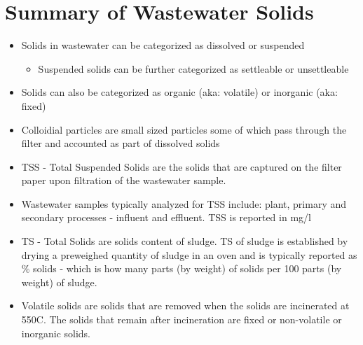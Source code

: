 	\section{Summary of Wastewater Solids}		
			\begin{itemize}
				\item Solids in wastewater can be categorized as dissolved or suspended
				      \begin{itemize}
				      	\item Suspended solids can be further categorized as settleable or unsettleable
				      \end{itemize}
				\item Solids can also be categorized as organic (aka: volatile) or inorganic (aka: fixed)
				\item Colloidial particles are small sized particles some of which pass through the filter and accounted as part of dissolved solids
				\item TSS - Total Suspended Solids are the solids that are captured on the filter paper upon filtration of the wastewater sample.  
				\item Wastewater samples typically analyzed for TSS include:  plant, primary and secondary processes - influent and effluent.  TSS is reported in mg/l
				\item TS - Total Solids are solids content of sludge.  TS of sludge is established by drying a preweighed quantity of sludge in an oven and is typically reported as \% solids - which is how many parts (by weight) of solids per 100 parts (by weight) of sludge.
				\item Volatile solids are solids that are removed when the solids are incinerated at 550C.  The solids that remain after incineration are fixed or non-volatile or inorganic solids.
			\end{itemize}
